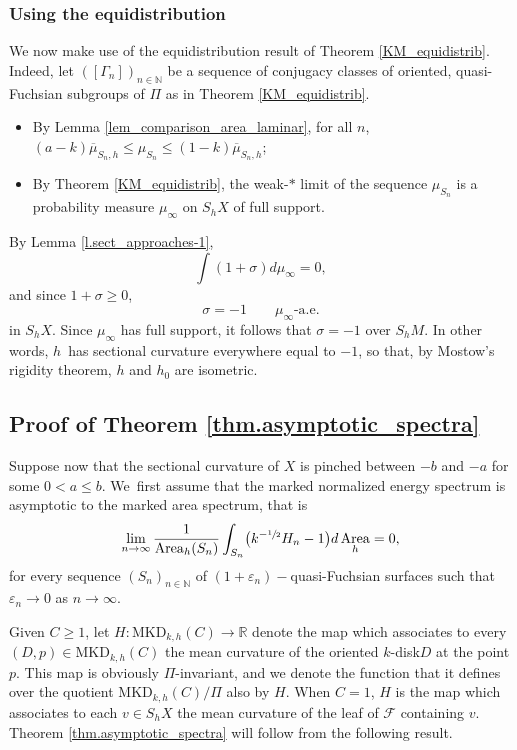 \documentclass[JEP,XML,SOM,Unicode,NoEqCountersInSection,published]{cedram}
\newcommand{\kdisk}{$k$\nobreakdash-disk\xspace}
\theoremstyle{plain}
\theoremstyle{definition}
\newcommand{\R}{{\mathbb R}}
\newcommand{\N}{{\mathbb N}}
\newcommand{\cF}{{\mathcal F}}
\let\eps\varepsilon
\newcommand{\MKD}{\mathrm{MKD}}
\DeclareMathOperator{\Area}{Area}
\begin{document}
\subsubsection{Using the equidistribution} We now make use of the equidistribution result of Theorem \ref{KM_equidistrib}. Indeed, let $([\Gamma_n])_{n\in\N}$ be a sequence of conjugacy classes of oriented, quasi-Fuchsian subgroups of $\Pi$ as in Theorem \ref{KM_equidistrib}.
\begin{itemize}
\item By Lemma \ref{lem_comparison_area_laminar}, for all $n$, $(a-k)\overline\mu_{S_n,h}\leq\mu_{S_n}\leq(1-k)\overline\mu_{S_n,h}$;
\item By Theorem \ref{KM_equidistrib}, the weak-$\ast$ limit of the sequence $\mu_{S_n}$ is a probability measure $\mu_\infty$ on $S_hX$ of full support.
\end{itemize}
By Lemma \ref{l.sect_approaches-1},
\begin{equation*}
\int(1+\sigma)d\mu_\infty=0,
\end{equation*}
and since $1+\sigma\geq 0$,
\begin{equation*}
\sigma=-1\qquad \mu_\infty\text{-a.e.}
\end{equation*} in $S_hX$. Since $\mu_\infty$ has full support, it follows that $\sigma=-1$ over $S_hM$. In other words, $h$~has sectional curvature everywhere equal to $-1$, so that, by Mostow's rigidity theorem, $h$ and $h_0$ are isometric.

\subsection{Proof of Theorem \ref{thm.asymptotic_spectra}}\label{ss.proof_of_thm_B}

Suppose now that the sectional curvature of $X$ is pinched between $-b$ and $-a$ for some $0<a\leq b$. We~first assume that the marked normalized energy spectrum is asymptotic to the marked area spectrum, that is
\begin{equation}\label{eq.hypothesis}
\lim_{n\to\infty}\frac{1}{\Area_h(S_n)}\int_{S_n}\bigl(k^{-\sfrac{1}{2}}H_n-1\bigr)d\Area_h=0,
\end{equation}
for every sequence $(S_n)_{n \in\N}$ of $(1+\eps_n)-$quasi-Fuchsian surfaces such that $\eps_n\to 0$ as $n\to\infty$.

Given $C\geq 1$, let $H:\MKD_{k,h}(C)\to\R$ denote the map which associates to every $(D,p)\in \MKD_{k,h}(C)$ the mean curvature of the oriented \kdisk $D$ at the point $p$. This map is obviously $\Pi$-invariant, and we denote the function that it defines over the quotient $\MKD_{k,h}(C)/\Pi$ also by $H$. When $C=1$, $H$ is the map which associates to each $v\in S_hX$ the mean curvature of the leaf of $\cF$ containing $v$. Theorem \ref{thm.asymptotic_spectra} will follow from the following result.
\end{document}
